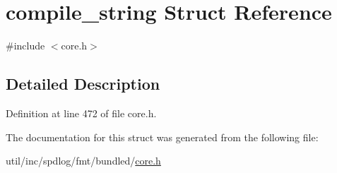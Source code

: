 \hypertarget{structcompile__string}{}\section{compile\+\_\+string Struct Reference}
\label{structcompile__string}


{\ttfamily \#include $<$core.\+h$>$}



\subsection{Detailed Description}


Definition at line 472 of file core.\+h.



The documentation for this struct was generated from the following file\+:\begin{DoxyCompactItemize}
\item 
util/inc/spdlog/fmt/bundled/\hyperlink{core_8h}{core.\+h}\end{DoxyCompactItemize}
